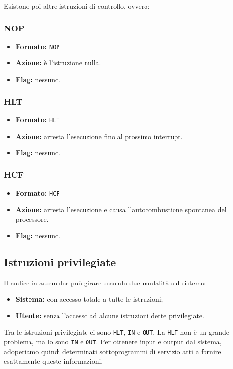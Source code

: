 \documentclass[a4paper,11pt]{article}
\begin{document}
\par\medskip 
Esistono poi altre istruzioni di controllo, ovvero:

\subsubsection{NOP}
\begin{itemize}
	\item \textbf{Formato:} \lstinline|NOP|
	\item \textbf{Azione:} è l'istruzione nulla. 
	\item \textbf{Flag:} nessuno.
\end{itemize}

\subsubsection{HLT}
\begin{itemize}
	\item \textbf{Formato:} \lstinline|HLT|
	\item \textbf{Azione:} arresta l'esecuzione fino al prossimo interrupt. 
	\item \textbf{Flag:} nessuno.
\end{itemize}

\subsubsection{HCF}
\begin{itemize}
	\item \textbf{Formato:} \lstinline|HCF|
	\item \textbf{Azione:} arresta l'esecuzione e causa l'autocombustione spontanea del processore. 
	\item \textbf{Flag:} nessuno.
\end{itemize}

\subsection{Istruzioni privilegiate}
Il codice in assembler può girare secondo due modalità sul sistema:
\begin{itemize}
	\item \textbf{Sistema:} con accesso totale a tutte le istruzioni;
	\item \textbf{Utente:} senza l'accesso ad alcune istruzioni dette privilegiate.
\end{itemize}

Tra le istruzioni privilegiate ci sono \lstinline|HLT|, \lstinline|IN| e \lstinline|OUT|.
La \lstinline|HLT| non è un grande problema, ma lo sono \lstinline|IN| e \lstinline|OUT|.
Per ottenere input e output dal sistema, adoperiamo quindi determinati sottoprogrammi di servizio atti a fornire esattamente queste informazioni.
\end{document}
